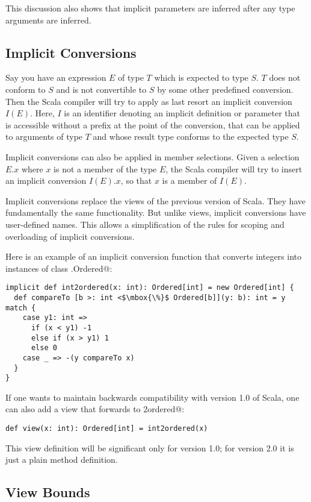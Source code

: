 \documentclass[a4paper,11pt,twoside]{article}
\begin{document}
This discussion also shows that implicit parameters are inferred after
any type arguments are inferred. 

\subsection*{Implicit Conversions}

Say you have an expression $E$ of type $T$ which is expected to type
$S$. $T$ does not conform to $S$ and is not convertible to $S$ by
some other predefined conversion. Then the Scala compiler will try to
apply as last resort an implicit conversion $I(E)$. Here, $I$ is an
identifier denoting an implicit definition or parameter that is
accessible without a prefix at the point of the conversion, that can
be applied to arguments of type $T$ and whose result type conforms to the
expected type $S$.

Implicit conversions can also be applied in member
selections. Given a selection $E.x$ where $x$ is not a member of the
type $E$, the Scala compiler will try to insert an implicit conversion
$I(E).x$, so that $x$ is a member of $I(E)$.

Implicit conversions replace the views of the previous version of Scala. They have
fundamentally the same functionality. But unlike views, implicit
conversions have user-defined names. This allows a simplification of
the rules for scoping and overloading of implicit conversions.

Here is an example of an implicit conversion function that converts
integers into instances of class \lstinline@scala.Ordered@:
\begin{lstlisting}
implicit def int2ordered(x: int): Ordered[int] = new Ordered[int] {
  def compareTo [b >: int <$\mbox{\%}$ Ordered[b]](y: b): int = y match {
    case y1: int =>
      if (x < y1) -1
      else if (x > y1) 1
      else 0
    case _ => -(y compareTo x)
  }
}
\end{lstlisting}
If one wants to maintain backwards compatibility with version 1.0 of Scala, one can
also add a view that forwards to \lstinline@int2ordered@:
\begin{lstlisting}
def view(x: int): Ordered[int] = int2ordered(x)
\end{lstlisting}
This view definition will be significant only for version 1.0; for version 2.0
it is just a plain method definition.

\subsection*{View Bounds}
\end{document}
